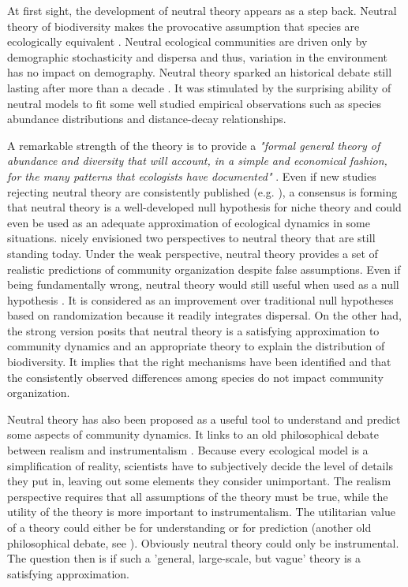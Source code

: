 \documentclass[12pt]{article}
\begin{document}
At first sight, the development of neutral theory appears as a step back.
Neutral theory of biodiversity makes the provocative assumption that species are
ecologically equivalent \parencite{Bell2000,Hubbell2001}. Neutral ecological
communities are driven only by demographic stochasticity and dispersa and thus,
variation in the environment has no impact on demography. Neutral theory sparked
an historical debate still lasting after more than a decade
\parencite{Chave2004, Etienne2011, Rosindell2012,Clark2012}. It was stimulated
by the surprising ability of neutral models to fit some well studied empirical
observations such as species abundance distributions and distance-decay
relationships.

A remarkable strength of the theory is to provide a \emph{"formal general theory
of abundance and diversity that will account, in a simple and economical
fashion, for the many patterns that ecologists have documented"}
\parencite{Bell2001}. Even if new studies rejecting neutral theory are
consistently published (e.g. \textcite{Ricklefs2012}), a consensus is forming
that neutral theory is a well-developed null hypothesis for niche theory and
could even be used as an adequate approximation of ecological dynamics in some
situations. \textcite{Bell2001} nicely envisioned two perspectives to neutral
theory that are still standing today. Under the weak perspective, neutral theory
provides a set of realistic predictions of community organization despite false
assumptions. Even if being fundamentally wrong, neutral theory would still
useful when used as a null hypothesis \parencite{Gotelli2006}. It is considered
as an improvement over traditional null hypotheses based on randomization
\parencite{Gotelli2000} because it readily integrates dispersal. On the other
had, the strong version posits that neutral theory is a satisfying approximation
to community dynamics and an appropriate theory to explain the distribution of
biodiversity. It implies that the right mechanisms have been identified and that
the consistently observed differences among species do not impact community
organization.

Neutral theory has also been proposed as a useful tool to understand and predict
some aspects of community dynamics. It links to an old philosophical debate
between realism and instrumentalism \parencite{Wennekes2012}. Because every
ecological model is a simplification of reality, scientists have to subjectively
decide the level of details they put in, leaving out some elements they consider
unimportant. The realism perspective requires that all assumptions of the theory
must be true, while the utility of the theory is more important to
instrumentalism. The utilitarian value of a theory could either be for
understanding or for prediction (another old philosophical debate, see
\textcite{Shmueli2010}). Obviously neutral theory could only be instrumental.
The question then is if such a 'general, large-scale, but vague' theory
\parencite{Wennekes2012} is a satisfying approximation.
\end{document}
